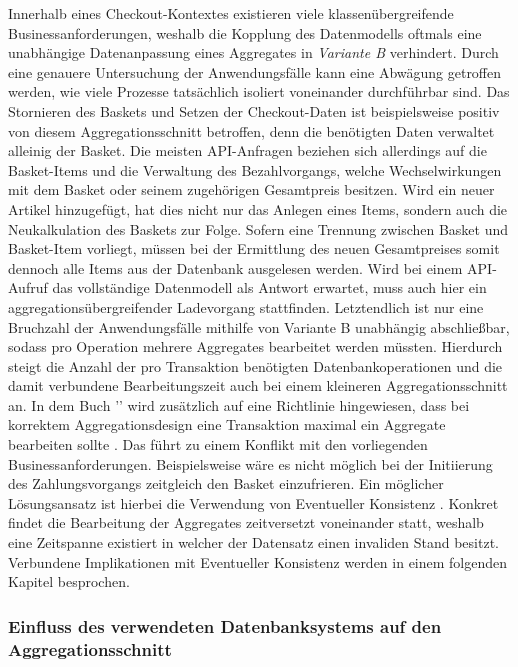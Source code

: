 Innerhalb eines Checkout-Kontextes existieren viele klassenübergreifende Businessanforderungen, weshalb die Kopplung des Datenmodells oftmals eine unabhängige Datenanpassung eines Aggregates in \emph{Variante B} verhindert. Durch eine genauere Untersuchung der Anwendungsfälle kann eine Abwägung getroffen werden, wie viele Prozesse tatsächlich isoliert voneinander durchführbar sind. Das Stornieren des Baskets und Setzen der Checkout-Daten ist beispielsweise positiv von diesem Aggregationsschnitt betroffen, denn die benötigten Daten verwaltet alleinig der Basket. Die meisten API-Anfragen beziehen sich allerdings auf die Basket-Items und die Verwaltung des Bezahlvorgangs, welche Wechselwirkungen mit dem Basket oder seinem zugehörigen Gesamtpreis besitzen. Wird ein neuer Artikel hinzugefügt, hat dies nicht nur das Anlegen eines Items, sondern auch die Neukalkulation des Baskets zur Folge. Sofern eine Trennung zwischen Basket und Basket-Item vorliegt, müssen bei der Ermittlung des neuen Gesamtpreises somit dennoch alle Items aus der Datenbank ausgelesen werden. Wird bei einem API-Aufruf das vollständige Datenmodell als Antwort erwartet, muss auch hier ein aggregationsübergreifender Ladevorgang stattfinden. Letztendlich ist nur eine Bruchzahl der Anwendungsfälle mithilfe von Variante B unabhängig abschließbar, sodass pro Operation mehrere Aggregates bearbeitet werden müssten. Hierdurch steigt die Anzahl der pro Transaktion benötigten Datenbankoperationen und die damit verbundene Bearbeitungszeit auch bei einem kleineren Aggregationsschnitt an. In dem Buch '' wird zusätzlich auf eine Richtlinie hingewiesen, dass bei korrektem Aggregationsdesign eine Transaktion maximal ein Aggregate bearbeiten sollte \cite[S. 354]{Vernon.2015}. Das führt zu einem Konflikt mit den vorliegenden Businessanforderungen. Beispielsweise wäre es nicht möglich bei der Initiierung des Zahlungsvorgangs zeitgleich den Basket einzufrieren. Ein möglicher Lösungsansatz ist hierbei die Verwendung von Eventueller Konsistenz \cite[S. 364]{Vernon.2015}. Konkret findet die Bearbeitung der Aggregates zeitversetzt voneinander statt, weshalb eine Zeitspanne existiert in welcher der Datensatz einen invaliden Stand besitzt. Verbundene Implikationen mit Eventueller Konsistenz werden in einem folgenden Kapitel besprochen.

\subsubsection{Einfluss des verwendeten Datenbanksystems auf den Aggregationsschnitt}

